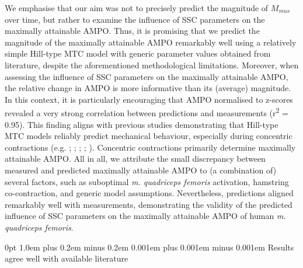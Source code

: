 \documentclass[
  11pt,
  a4paper]{article}
\makeatletter
\renewcommand{\subsection}{%
  \@startsection{subsection}{2}
    {0pt} 					%
    {1.0em plus 0.2em minus 0.2em} 	%
    {0.001em plus 0.001em minus 0.001em}    	%
    {\large\bfseries\sffamily}%
}
\makeatother
\begin{document}
We emphasise that our aim was not to precisely predict the magnitude of
\(M_{mus}\) over time, but rather to examine the influence of SSC
parameters on the maximally attainable AMPO. Thus, it is promising that
we predict the magnitude of the maximally attainable AMPO remarkably
well using a relatively simple Hill-type MTC model with generic
parameter values obtained from literature, despite the aforementioned
methodological limitations. Moreover, when assessing the influence of
SSC parameters on the maximally attainable AMPO, the relative change in
AMPO is more informative than its (average) magnitude. In this context,
it is particularly encouraging that AMPO normalised to z-scores revealed
a very strong correlation between predictions and measurements
(r\textsuperscript{2} = 0.95). This finding aligns with previous studies
demonstrating that Hill-type MTC models reliably predict mechanical
behaviour, especially during concentric contractions (e.g.
; ;
;
;
).
Concentric contractions primarily determine maximally attainable AMPO.
All in all, we attribute the small discrepancy between measured and
predicted maximally attainable AMPO to (a combination of) several
factors, such as suboptimal \emph{m. quadriceps femoris} activation,
hamstring co-contraction, and generic model assumptions. Nevertheless,
predictions aligned remarkably well with measurements, demonstrating the
validity of the predicted influence of SSC parameters on the maximally
attainable AMPO of human \emph{m. quadriceps femoris}.

\subsection{Results agree well with available
literature}\label{results-agree-well-with-available-literature}
\end{document}
